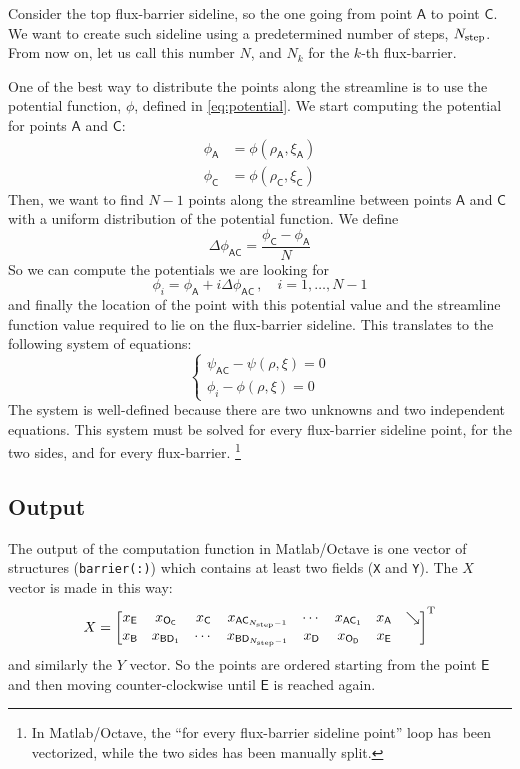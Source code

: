 \documentclass[b5paper,11pt,oneside,fleqn]{article}
\newcommand{\ap}[1]{^\textup{#1}}
\newcommand{\pt}[1]{\mathsf{#1}}
\newcommand{\Nstep}{N_{\textup{step}}}
\begin{document}
Consider the top flux-barrier sideline, so the one going from point $ \pt{A} $ 
to point $ \pt{C} $.
We want to create such sideline using a predetermined number of steps,
$ \Nstep $. From now on, let us call this number $ N $, 
and $ N_k $ for the $ k $-th flux-barrier.

One of the best way to distribute the points along the streamline is to use the 
potential function, $ \phi $, defined in \autoref{eq:potential}.
We start computing the potential for points $ \pt{A} $ and $ \pt{C} $:
\begin{equation*}
\begin{aligned}
\phi_\pt{A} &= \phi(\rho_\pt{A}, \xi_\pt{A}) \\
\phi_\pt{C} &= \phi(\rho_\pt{C}, \xi_\pt{C}) 
\end{aligned}
\end{equation*}
Then, we want to find $ N-1 $ points along the streamline
between points $ \pt{A} $ and $ \pt{C} $
with a uniform distribution of the potential function.
We define
\begin{equation*}
\Delta\phi_{\pt{AC}} = \frac{\phi_\pt{C} - \phi_\pt{A}}{N}
\end{equation*}
So we can compute the potentials we are looking for
\[
\phi_i = \phi_\pt{A} + i \Delta\phi_{\pt{AC}} \,,\quad i=1,\ldots,N-1
\]
and finally the location of the point with this potential value and the 
streamline function value required to lie on the flux-barrier sideline.
This translates to the following system of equations:
\begin{equation}
\begin{cases}
\psi_{\pt{AC}} - \psi(\rho,\xi) = 0 \\
\phi_i - \phi(\rho,\xi) = 0
\end{cases}
\end{equation}
The system is well-defined because there are two unknowns and two independent 
equations. This system must be solved for every flux-barrier sideline point, 
for the two sides, and for every flux-barrier.%
\footnote{In Matlab/Octave, the ``for every flux-barrier sideline point'' loop 
has been vectorized, while the two sides has been manually split.}


\subsection{Output}

The output of the computation function in Matlab/Octave is one vector of 
structures (\texttt{barrier(:)}) which contains at least two fields (\texttt{X} 
and \texttt{Y}).
%
The $ X $ vector is made in this way:
\[
X = 
\begin{bmatrix}
x_\pt{E} &
x_{\pt{O}_{\pt{C}}} & 
x_\pt{C} &
%
x_{\pt{AC}_{\Nstep-1}} &
\cdots &
x_{\pt{AC}_1} &
x_\pt{A} &
\searrow \\
%
x_\pt{B} & 
x_{\pt{BD}_1} &
\cdots &
x_{\pt{BD}_{\Nstep-1}} &
%
x_\pt{D} &
x_{\pt{O}_{\pt{D}}} & 
x_\pt{E} 
\end{bmatrix}\ap{T}
\]
and similarly the $ Y $ vector. So the points are ordered starting from the 
point $ \pt{E} $ and then moving counter-clockwise until $ \pt{E} $ is reached 
again.
\end{document}
